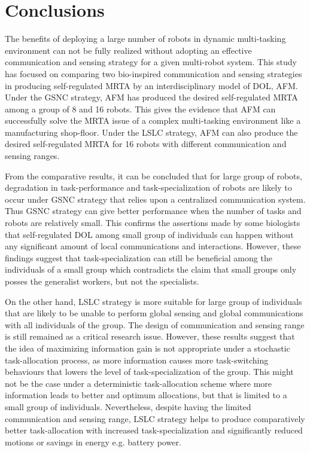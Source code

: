 \chapter{Conclusions}
The benefits of deploying a large number of robots in dynamic multi-tasking environment can not be fully realized without adopting an effective communication and sensing strategy for a given multi-robot system. This study has focused on comparing two bio-inspired  communication and sensing strategies in producing self-regulated MRTA by an interdisciplinary model of DOL, AFM. Under the GSNC strategy, AFM has produced the desired self-regulated MRTA among a group of 8 and 16 robots. This gives the evidence that AFM can successfully solve the MRTA issue of a complex multi-tasking environment like a manufacturing shop-floor. Under the LSLC strategy, AFM can also produce the desired self-regulated MRTA for 16 robots with different communication and sensing ranges.

From the comparative results, it can be concluded that for large group of robots,  degradation in  task-performance and task-specialization of robots are likely to occur  under GSNC strategy that relies upon a centralized communication system. Thus GSNC strategy can give better performance when the number of tasks and robots are relatively small. This confirms the assertions made by some biologists that self-regulated DOL among small group of individuals can happen without any significant amount of local communications and interactions. However, these findings suggest that task-specialization can still be beneficial among the individuals of a small group which contradicts the claim that small groups only posses the generalist workers, but not the specialists.

On the other hand, LSLC strategy is more suitable for large group of individuals that are likely to be unable to perform global sensing and global communications with all individuals of the group. The design of communication and sensing range is still remained as a critical research issue. However, these results suggest that the idea of maximizing information gain is not appropriate under a stochastic task-allocation process, as more information causes more task-switching behaviours that lowers the level of task-specialization of the group. This might not be the case under a deterministic task-allocation scheme where more information leads to better and optimum allocations, but that is limited to a small group of individuals. Nevertheless, despite having the limited communication and sensing range, LSLC strategy helps to produce comparatively better task-allocation with increased task-specialization and significantly reduced motions or savings in energy e.g. battery power.

